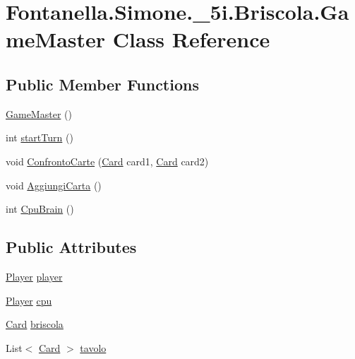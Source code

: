 \hypertarget{class_fontanella_1_1_simone_1_1__5i_1_1_briscola_1_1_game_master}{}\section{Fontanella.\+Simone.\+\_\+5i.\+Briscola.\+Game\+Master Class Reference}
\label{class_fontanella_1_1_simone_1_1__5i_1_1_briscola_1_1_game_master}
\subsection*{Public Member Functions}
\begin{DoxyCompactItemize}
\item 
\hyperlink{class_fontanella_1_1_simone_1_1__5i_1_1_briscola_1_1_game_master_a8ccf5663cf434aba91fb49c93ad1971e}{Game\+Master} ()
\item 
int \hyperlink{class_fontanella_1_1_simone_1_1__5i_1_1_briscola_1_1_game_master_a43255b1c949556008efd7d22256fd294}{start\+Turn} ()
\item 
void \hyperlink{class_fontanella_1_1_simone_1_1__5i_1_1_briscola_1_1_game_master_af7df7cf04ba55033629ead2c41723821}{Confronto\+Carte} (\hyperlink{class_fontanella_1_1_simone_1_1__5i_1_1_briscola_1_1_card}{Card} card1, \hyperlink{class_fontanella_1_1_simone_1_1__5i_1_1_briscola_1_1_card}{Card} card2)
\item 
void \hyperlink{class_fontanella_1_1_simone_1_1__5i_1_1_briscola_1_1_game_master_a0daac357a7038fb2229cd916050ff1de}{Aggiungi\+Carta} ()
\item 
int \hyperlink{class_fontanella_1_1_simone_1_1__5i_1_1_briscola_1_1_game_master_affb9a5a6fa94208a622c976f9d3cf6bd}{Cpu\+Brain} ()
\end{DoxyCompactItemize}
\subsection*{Public Attributes}
\begin{DoxyCompactItemize}
\item 
\hyperlink{class_fontanella_1_1_simone_1_1__5i_1_1_briscola_1_1_player}{Player} \hyperlink{class_fontanella_1_1_simone_1_1__5i_1_1_briscola_1_1_game_master_ad26dcfbe972933f69347ff5219b9c668}{player}
\item 
\hyperlink{class_fontanella_1_1_simone_1_1__5i_1_1_briscola_1_1_player}{Player} \hyperlink{class_fontanella_1_1_simone_1_1__5i_1_1_briscola_1_1_game_master_ac4cb67561d9cec29ca3d046e85b22196}{cpu}
\item 
\hyperlink{class_fontanella_1_1_simone_1_1__5i_1_1_briscola_1_1_card}{Card} \hyperlink{class_fontanella_1_1_simone_1_1__5i_1_1_briscola_1_1_game_master_a292123e911a73c41132d10ca7fcaf8fa}{briscola}
\item 
List$<$ \hyperlink{class_fontanella_1_1_simone_1_1__5i_1_1_briscola_1_1_card}{Card} $>$ \hyperlink{class_fontanella_1_1_simone_1_1__5i_1_1_briscola_1_1_game_master_adcaefbbcbe19d0539c429d66c5c8f431}{tavolo}
\end{DoxyCompactItemize}
